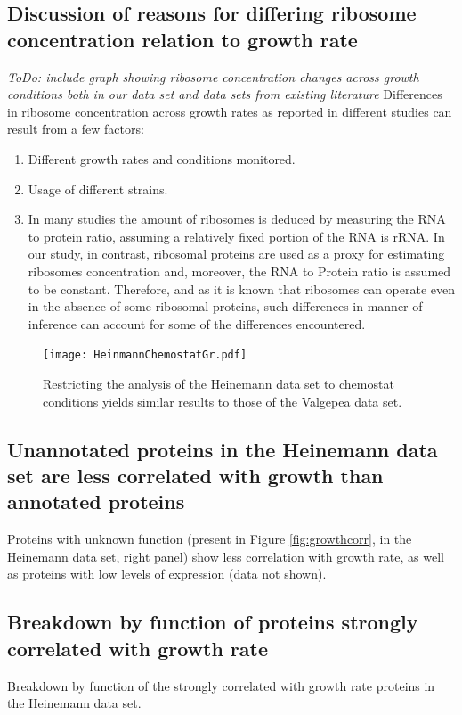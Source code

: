 \documentclass[notitlepage]{article}
\begin{document}
\subsection{Discussion of reasons for differing ribosome concentration relation to growth rate}
\label{ribosomeconc}
\emph{ToDo: include graph showing ribosome concentration changes across growth conditions both in our data set and data sets from existing literature}
Differences in ribosome concentration  across growth rates as reported in different studies can result from a few factors:
\begin{enumerate}
\item Different growth rates and conditions monitored.
\item Usage of different strains.
\item In many studies the amount of ribosomes is deduced by measuring the RNA to protein ratio, assuming a relatively fixed portion of the RNA is rRNA.
In our study, in contrast, ribosomal proteins are used as a proxy for estimating ribosomes concentration and, moreover, the RNA to Protein ratio is assumed to be constant.
Therefore, and as it is known that ribosomes can operate even in the absence of some ribosomal proteins, such differences in manner of inference can account for some of the differences encountered.
\end{enumerate}

\begin{figure}[h]
\centering
\texttt{[image: HeinmannChemostatGr.pdf]}
\caption{
  Restricting the analysis of the Heinemann data set to chemostat conditions yields similar results to those of the Valgepea data set.
}
\label{fig:growthcorrchemo}
\end{figure}
\subsection{Unannotated proteins in the Heinemann data set are less correlated with growth than annotated proteins}
Proteins with unknown function (present in Figure \ref{fig:growthcorr}, in the Heinemann data set, right panel) show less correlation with growth rate, as well as proteins with low levels of expression (data not shown).

\subsection{Breakdown by function of proteins strongly correlated with growth rate}
\begin{table}[h]
\centering
\caption{Breakdown by function of the strongly correlated with growth rate proteins in the Heinemann data set.}
\label{tab:corrbreakdownh}
\end{table}
\end{document}
